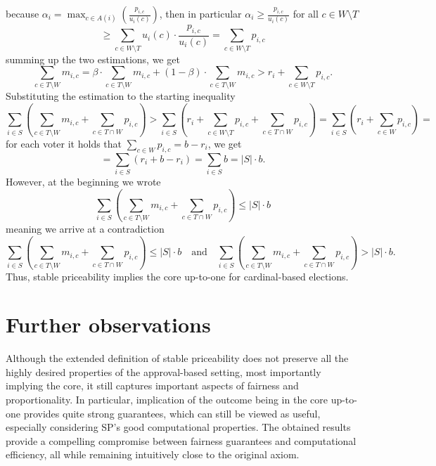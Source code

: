 because $\alpha_i=\max_{c\in A(i)}\left(\frac{p_{i,c}}{u_i(c)} \right)$, then in particular $\alpha_i\ge \frac{p_{i,c}}{u_i(c)}$ for all $c\in W\setminus T$
$$
\ge \sum_{c\in W\setminus T}u_i(c)\cdot\frac{p_{i,c}}{u_i(c)} = \sum_{c\in W\setminus T}p_{i,c}
$$
summing up the two estimations, we get
$$
\sum_{c\in T\setminus W}m_{i,c} = \beta\cdot \sum_{c\in T\setminus W}m_{i,c} + (1-\beta)\cdot \sum_{c\in T\setminus W}m_{i,c} > r_i + \sum_{c\in W\setminus T}p_{i,c}.
$$
Substituting the estimation to the starting inequality
$$
\sum_{i\in S}\left( \sum_{c\in T\setminus W}m_{i,c} + \sum_{c\in T\cap W}p_{i,c} \right) > \sum_{i\in S}\left(r_i + \sum_{c\in W\setminus T}p_{i,c} + \sum_{c\in T\cap W}p_{i,c}\right) = \sum_{i\in S}\left(r_i+\sum_{c\in W}p_{i,c} \right)=
$$
for each voter it holds that $\sum_{c\in W}p_{i,c}=b-r_i$, we get
$$
=\sum_{i\in S}(r_i+b-r_i)=\sum_{i\in S}b = |S|\cdot b.
$$
However, at the beginning we wrote
$$
\sum_{i\in S}\left(\sum_{c\in T\setminus W}m_{i,c} + \sum_{c\in T\cap W}p_{i,c} \right) \le |S|\cdot b
$$
meaning we arrive at a contradiction
$$
\sum_{i\in S}\left(\sum_{c\in T\setminus W}m_{i,c} + \sum_{c\in T\cap W}p_{i,c} \right) \le |S|\cdot b \quad \text{and} \quad \sum_{i\in S}\left(\sum_{c\in T\setminus W}m_{i,c} + \sum_{c\in T\cap W}p_{i,c} \right) > |S|\cdot b.
$$
Thus, stable priceability implies the core up-to-one for cardinal-based elections.
\section{Further observations}
Although the extended definition of stable priceability does not preserve all the highly desired properties of the approval-based setting, most importantly implying the core, it still captures important aspects of fairness and proportionality. In particular, implication of the outcome being in the core up-to-one provides quite strong guarantees, which can still be viewed as useful, especially considering SP's good computational properties. The obtained results provide a compelling compromise between fairness guarantees and computational efficiency, all while remaining intuitively close to the original axiom.
